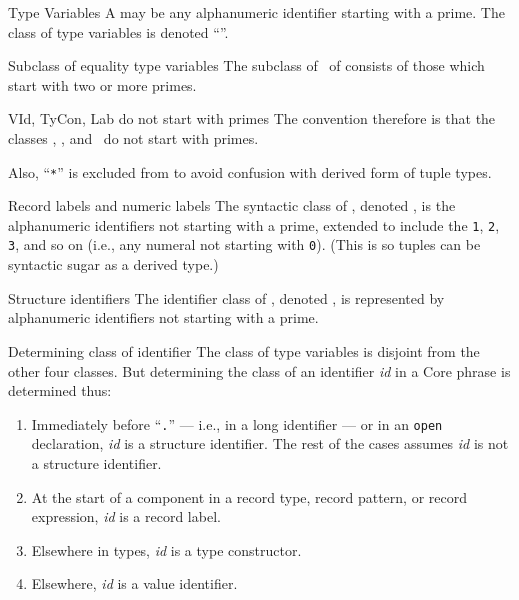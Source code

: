 \begin{definition}{Type Variables}
A  may be any alphanumeric identifier starting
with a prime. The class of type variables is denoted ``{\TyVar}''.
\end{definition}

\begin{definition}{Subclass of equality type variables}\label{defn:syntax-core:etyvar}
The subclass of  \EtyVar\ of {\TyVar}
consists of those which start with two or more primes.
\end{definition}

\begin{convention}{VId, TyCon, Lab do not start with primes}
The convention therefore is that the classes \VId, \TyCon, and \Lab\ do
not start with primes.

Also, ``\texttt{*}'' is excluded from {\TyCon} to avoid confusion with
derived form of tuple types.
\end{convention}

\begin{definition}{Record labels and numeric labels}\label{defn:record-and-numeric-labels}
The syntactic class of , denoted {\Lab}, is
the alphanumeric identifiers not starting with a prime, extended to
include the  \texttt{1}, \texttt{2}, \texttt{3},
and so on (i.e., any numeral not starting with \texttt{0}).
(This is so tuples can be syntactic sugar as a derived type.)
\end{definition}

\begin{definition}{Structure identifiers}\label{defn:StrId}
The identifier class of , denoted \StrId,
is represented by alphanumeric identifiers not starting with a prime.
\end{definition}

\begin{clause}{Determining class of identifier}
The class of type variables is disjoint from the other four classes. But
determining the class of an identifier \textit{id} in a Core phrase is
determined thus:
\begin{enumerate}
\item Immediately before ``\texttt{.}'' --- i.e., in a long identifier
  --- or in an \texttt{open} declaration, \textit{id} is a structure
  identifier. The rest of the cases assumes \textit{id} is not a structure identifier.
\item At the start of a component in a record type, record pattern, or
  record expression, \textit{id} is a record label.
\item Elsewhere in types, \textit{id} is a type constructor.
\item Elsewhere, \textit{id} is a value identifier.
\end{enumerate}
\end{clause}

